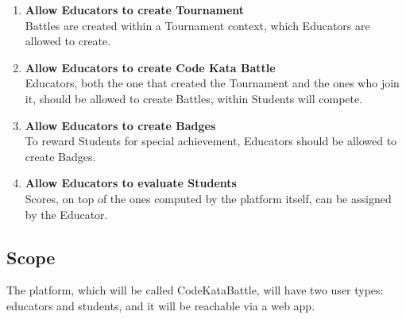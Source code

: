 \begin{enumerate}[label=$\bullet$ \textbf{GE\arabic*:}]
    \item \textbf{Allow Educators to create Tournament}\\Battles are created within a Tournament context, which Educators are allowed to create.
    \item \textbf{Allow Educators to create Code Kata Battle}\\Educators, both the one that created the Tournament and the ones who join it, should be allowed to create Battles, within Students will compete.
    \item \textbf{Allow Educators to create Badges}\\To reward Students for special achievement, Educators should be allowed to create Badges.
    \item \textbf{Allow Educators to evaluate Students}\\Scores, on top of the ones computed by the platform itself, can be assigned by the Educator.
\end{enumerate}

\subsection{Scope}
The platform, which will be called CodeKataBattle, will have two user types: educators and students, and it will be reachable via a web app.

